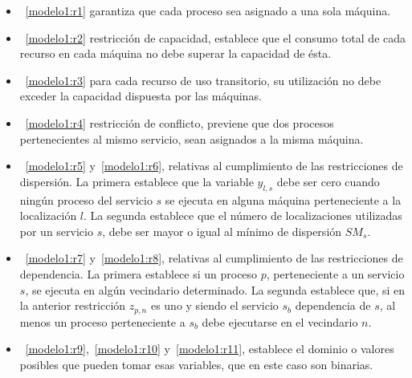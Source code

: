 \documentclass[../informe2.tex]{subfiles}
\begin{document}
\begin{itemize}
	\item~\eqref{modelo1:r1} garantiza que cada proceso sea asignado a una sola máquina.
	\item~\eqref{modelo1:r2} restricción de capacidad, establece que el consumo total de cada recurso en cada máquina no debe superar la capacidad de ésta.
	\item~\eqref{modelo1:r3} para cada recurso de uso transitorio, su utilización no debe exceder la capacidad dispuesta por las máquinas.
	\item~\eqref{modelo1:r4} restricción de conflicto, previene que dos procesos pertenecientes al mismo servicio, sean asignados a la misma máquina.
	\item~\eqref{modelo1:r5} y~\eqref{modelo1:r6}, relativas al cumplimiento de las restricciones de dispersión. La primera establece que la variable $y_{l,s}$ debe ser cero cuando ningún proceso del servicio $s$ se ejecuta en alguna máquina perteneciente a la localización $l$. La segunda establece que el número de localizaciones utilizadas por un servicio $s$, debe ser mayor o igual al mínimo de dispersión $SM_s$.
	\item~\eqref{modelo1:r7} y~\eqref{modelo1:r8}, relativas al cumplimiento de las restricciones de dependencia. La primera establece si un proceso $p$, perteneciente a un servicio $s$, se ejecuta en algún vecindario determinado. La segunda establece que, si en la anterior restricción $z_{p,n}$ es uno y siendo el servicio $s_b$ dependencia de $s$, al menos un proceso perteneciente a $s_b$ debe ejecutarse en el vecindario $n$.
	\item~\eqref{modelo1:r9},~\eqref{modelo1:r10} y~\eqref{modelo1:r11}, establece el dominio o valores posibles que pueden tomar esas variables, que en este caso son binarias.
\end{itemize}
\end{document}
